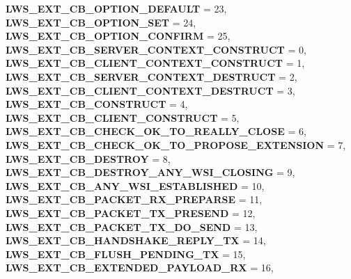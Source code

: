 \begin{DoxyCompactItemize}
{\bfseries L\+W\+S\+\_\+\+E\+X\+T\+\_\+\+C\+B\+\_\+\+O\+P\+T\+I\+O\+N\+\_\+\+D\+E\+F\+A\+U\+LT} = 23, 
\newline
{\bfseries L\+W\+S\+\_\+\+E\+X\+T\+\_\+\+C\+B\+\_\+\+O\+P\+T\+I\+O\+N\+\_\+\+S\+ET} = 24, 
{\bfseries L\+W\+S\+\_\+\+E\+X\+T\+\_\+\+C\+B\+\_\+\+O\+P\+T\+I\+O\+N\+\_\+\+C\+O\+N\+F\+I\+RM} = 25, 
{\bfseries L\+W\+S\+\_\+\+E\+X\+T\+\_\+\+C\+B\+\_\+\+S\+E\+R\+V\+E\+R\+\_\+\+C\+O\+N\+T\+E\+X\+T\+\_\+\+C\+O\+N\+S\+T\+R\+U\+CT} = 0, 
{\bfseries L\+W\+S\+\_\+\+E\+X\+T\+\_\+\+C\+B\+\_\+\+C\+L\+I\+E\+N\+T\+\_\+\+C\+O\+N\+T\+E\+X\+T\+\_\+\+C\+O\+N\+S\+T\+R\+U\+CT} = 1, 
\newline
{\bfseries L\+W\+S\+\_\+\+E\+X\+T\+\_\+\+C\+B\+\_\+\+S\+E\+R\+V\+E\+R\+\_\+\+C\+O\+N\+T\+E\+X\+T\+\_\+\+D\+E\+S\+T\+R\+U\+CT} = 2, 
{\bfseries L\+W\+S\+\_\+\+E\+X\+T\+\_\+\+C\+B\+\_\+\+C\+L\+I\+E\+N\+T\+\_\+\+C\+O\+N\+T\+E\+X\+T\+\_\+\+D\+E\+S\+T\+R\+U\+CT} = 3, 
{\bfseries L\+W\+S\+\_\+\+E\+X\+T\+\_\+\+C\+B\+\_\+\+C\+O\+N\+S\+T\+R\+U\+CT} = 4, 
{\bfseries L\+W\+S\+\_\+\+E\+X\+T\+\_\+\+C\+B\+\_\+\+C\+L\+I\+E\+N\+T\+\_\+\+C\+O\+N\+S\+T\+R\+U\+CT} = 5, 
\newline
{\bfseries L\+W\+S\+\_\+\+E\+X\+T\+\_\+\+C\+B\+\_\+\+C\+H\+E\+C\+K\+\_\+\+O\+K\+\_\+\+T\+O\+\_\+\+R\+E\+A\+L\+L\+Y\+\_\+\+C\+L\+O\+SE} = 6, 
{\bfseries L\+W\+S\+\_\+\+E\+X\+T\+\_\+\+C\+B\+\_\+\+C\+H\+E\+C\+K\+\_\+\+O\+K\+\_\+\+T\+O\+\_\+\+P\+R\+O\+P\+O\+S\+E\+\_\+\+E\+X\+T\+E\+N\+S\+I\+ON} = 7, 
{\bfseries L\+W\+S\+\_\+\+E\+X\+T\+\_\+\+C\+B\+\_\+\+D\+E\+S\+T\+R\+OY} = 8, 
{\bfseries L\+W\+S\+\_\+\+E\+X\+T\+\_\+\+C\+B\+\_\+\+D\+E\+S\+T\+R\+O\+Y\+\_\+\+A\+N\+Y\+\_\+\+W\+S\+I\+\_\+\+C\+L\+O\+S\+I\+NG} = 9, 
\newline
{\bfseries L\+W\+S\+\_\+\+E\+X\+T\+\_\+\+C\+B\+\_\+\+A\+N\+Y\+\_\+\+W\+S\+I\+\_\+\+E\+S\+T\+A\+B\+L\+I\+S\+H\+ED} = 10, 
{\bfseries L\+W\+S\+\_\+\+E\+X\+T\+\_\+\+C\+B\+\_\+\+P\+A\+C\+K\+E\+T\+\_\+\+R\+X\+\_\+\+P\+R\+E\+P\+A\+R\+SE} = 11, 
{\bfseries L\+W\+S\+\_\+\+E\+X\+T\+\_\+\+C\+B\+\_\+\+P\+A\+C\+K\+E\+T\+\_\+\+T\+X\+\_\+\+P\+R\+E\+S\+E\+ND} = 12, 
{\bfseries L\+W\+S\+\_\+\+E\+X\+T\+\_\+\+C\+B\+\_\+\+P\+A\+C\+K\+E\+T\+\_\+\+T\+X\+\_\+\+D\+O\+\_\+\+S\+E\+ND} = 13, 
\newline
{\bfseries L\+W\+S\+\_\+\+E\+X\+T\+\_\+\+C\+B\+\_\+\+H\+A\+N\+D\+S\+H\+A\+K\+E\+\_\+\+R\+E\+P\+L\+Y\+\_\+\+TX} = 14, 
{\bfseries L\+W\+S\+\_\+\+E\+X\+T\+\_\+\+C\+B\+\_\+\+F\+L\+U\+S\+H\+\_\+\+P\+E\+N\+D\+I\+N\+G\+\_\+\+TX} = 15, 
{\bfseries L\+W\+S\+\_\+\+E\+X\+T\+\_\+\+C\+B\+\_\+\+E\+X\+T\+E\+N\+D\+E\+D\+\_\+\+P\+A\+Y\+L\+O\+A\+D\+\_\+\+RX} = 16, 

\end{DoxyCompactItemize}
